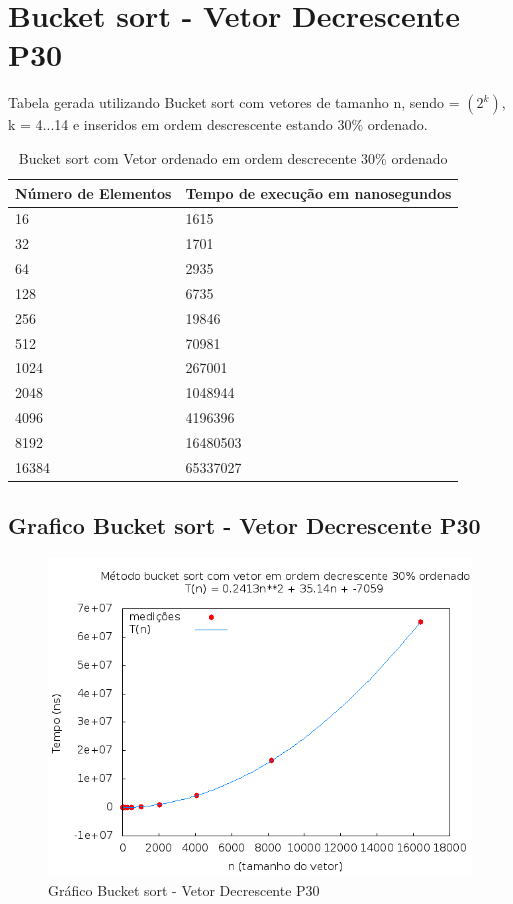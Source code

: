 \documentclass[12pt,a4paper,twoside]{report}
\begin{document}
\section{Bucket sort - Vetor Decrescente P30}
Tabela gerada utilizando Bucket sort com vetores de tamanho n, sendo = $(2^k)$, k = 4...14 e inseridos em ordem descrescente estando 30\% ordenado.

\begin{table}[H]
\centering
\caption{Bucket sort com Vetor ordenado em ordem descrecente 30\% ordenado}
\label{my-label}
\begin{tabular}{|l|l|}
\hline
\multicolumn{1}{|c|}{\textbf{Número de Elementos}} & \multicolumn{1}{c|}{\textbf{Tempo de execução em nanosegundos}} \\ \hline
16 & 1615 \\ \hline
32 & 1701 \\ \hline
64 & 2935 \\ \hline
128 & 6735 \\ \hline
256 & 19846 \\ \hline
512 & 70981 \\ \hline
1024 & 267001 \\ \hline
2048 & 1048944 \\ \hline
4096 & 4196396 \\ \hline
8192 & 16480503 \\ \hline
16384 & 65337027 \\ \hline
\end{tabular}
\end{table}

\subsection{Grafico Bucket sort - Vetor Decrescente P30}
\begin{figure}[H]
    \centering
    \includegraphics[width=0.7\linewidth]{graficos/Bucket/vIntDecrescenteP30/vIntDecrescenteP30.png}
  \caption{Gráfico Bucket sort - Vetor Decrescente P30}
\end{figure}
\end{document}
